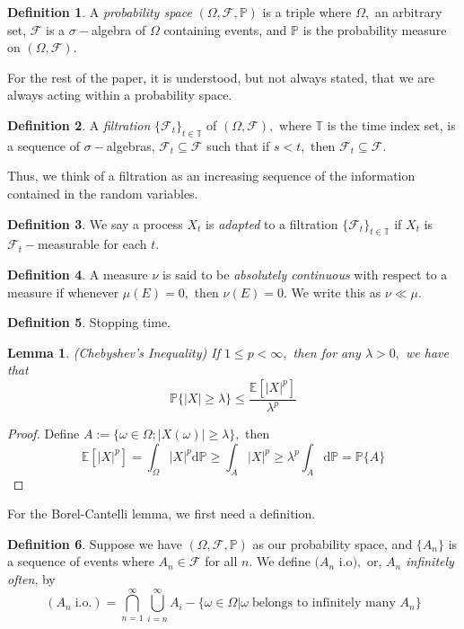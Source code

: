 \documentclass[openany, amssymb, psamsfonts]{amsart}
\newtheorem{lem}{Lemma}[section]
\theoremstyle{definition}
\newtheorem{defn}{Definition}[section]
\numberwithin{equation}{section}
\newcommand{\bbE}{\mathbb{E}}
\newcommand{\bbP}{\mathbb{P}}
\newcommand{\bbT}{\mathbb{T}}
\newcommand{\dd}{\mathrm{d}}
\begin{document}
\begin{defn}
A \textit{probability space} $(\Omega, \mathcal{F}, \mathbb{P})$ is a triple where $\Omega,$ an arbitrary set, $\mathcal{F}$ is a $\sigma-$algebra of $\Omega$ containing events, and $\mathbb{P}$ is the probability measure on $(\Omega, \mathcal{F}).$
\end{defn}
For the rest of the paper, it is understood, but not always stated, that we are always acting within a probability space. 

\begin{defn}
A \textit{filtration} $\{\mathcal{F}_t\}_{t\in \mathbb{T}}$ of $(\Omega, \mathcal{F}),$ where $\mathbb{T}$ is the time index set, is a sequence of $\sigma-$algebras, $\mathcal{F}_t\subseteq \mathcal{F}$ such that if $s<t,$ then $\mathcal{F}_t\subseteq \mathcal{F}.$
\end{defn}


Thus, we think of a filtration as an increasing sequence of the information contained in the random variables. 

\begin{defn}We say a process $X_t$ is \textit{adapted} to a filtration $\{\mathcal{F}_t\}_{t\in \bbT}$ if $X_t$ is $\mathcal{F}_t-$measurable for each $t.$
\end{defn}

\begin{defn}A measure $\nu$ is said to be \textit{absolutely continuous} with respect to a measure if whenever $\mu(E) = 0,$ then $\nu(E) =0.$ We write this as $\nu\ll\mu.$
\end{defn}

\begin{defn}
Stopping time.
\end{defn}

\begin{lem}
(Chebyshev's Inequality) If $1\leq p < \infty,$ then for any $\lambda>0,$ we have that
\[\bbP\{|X|\geq \lambda\}\leq \frac{\bbE[|X|^p]}{\lambda^p}\]
\end{lem}
\begin{proof} %
Define $A := \{\omega \in \Omega  ; |X(\omega)|\geq \lambda\},$ then 
\[\bbE[|X|^p] = \int_\Omega |X|^p \dd \bbP \geq \int_A |X|^p\geq \lambda^p \int_A\dd \bbP = \bbP\{A\}\]
\end{proof}

For the Borel-Cantelli lemma, we first need a definition.
\begin{defn}
Suppose we have $(\Omega, \mathcal{F}, \bbP)$ as our probability space, and $\{A_n\}$ is a sequence of events where $A_n \in \mathcal{F}$ for all $n.$ We define $(A_n$ i.o$),$  or, \textit{$A_n$ infinitely often}, by
\[(A_n\; \text{i.o.}) = \bigcap_{n=1}^\infty\bigcup_{i=n}^\infty A_i - \{\omega \in \Omega | \omega \; \text{belongs to infinitely many $A_n$}\}\]
\end{defn}
\end{document}
